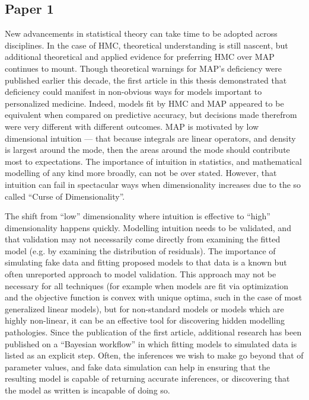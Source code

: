 \subsection{Paper 1}
New advancements in statistical theory can take time to be adopted across disciplines. In the case of HMC, theoretical understanding is still nascent, but additional theoretical and applied evidence for preferring HMC over MAP continues to mount.  Though theoretical warnings for MAP's deficiency were published earlier this decade, the first article in this thesis demonstrated that deficiency could manifest in non-obvious ways for models important to personalized medicine.  Indeed, models fit by HMC and MAP appeared to be equivalent when compared on predictive accuracy, but decisions made therefrom were very different with different outcomes.  MAP is motivated by low dimensional intuition --- that because integrals are linear operators, and density is largest around the mode, then the areas around the mode should contribute most to expectations.  The importance of intuition in statistics, and mathematical modelling of any kind more broadly, can not be over stated.  However, that intuition can fail in spectacular ways when dimensionality increases due to the so called ``Curse of Dimensionality''.

The shift from ``low'' dimensionality where intuition is effective to ``high'' dimensionality happens quickly. Modelling intuition needs to be validated, and that validation may not necessarily come directly from examining the fitted model (e.g. by examining the distribution of residuals).  The importance of simulating fake data and fitting proposed models to that data is a known but often unreported approach to model validation.  This approach may not be necessary for all techniques (for example when models are fit via optimization and the objective function is convex with unique optima, such in the case of most generalized linear models), but for non-standard models or models which are highly non-linear, it can be an effective tool for discovering hidden modelling pathologies.  Since the publication of the first article, additional research has been published on a ``Bayesian workflow''  \cite{gelman_bayesian_2020} in which fitting models to simulated data is listed as an explicit step.  Often, the inferences we wish to make go beyond that of parameter values, and fake data simulation can help in ensuring that the resulting model is capable of returning accurate inferences, or discovering that the model as written is incapable of doing so.

